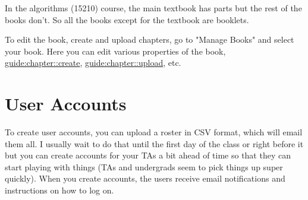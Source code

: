 \begin{example}
In the algorithms (15210) course, the main textbook has parts but
the rest of the books don't.  So all the books except for the textbook are booklets.
\end{example}


\begin{gram}
To edit the book, create and upload chapters, go to "Manage Books" and select your book.  Here you can edit various properties of the book, 
%
\href{create chapters}{guide:chapter::create}, 
%
\href{upload content}{guide:chapter::upload}, etc.
\end{gram}


\section{User Accounts} 

\begin{gram}[Creation]
To create user accounts, you can upload a roster in CSV format, which will email them all.  
%
I usually wait to do that until the first day of the class or right before it but you can create accounts for your TAs a bit ahead of time so that they can start playing with things (TAs and undergrads seem to pick things up super quickly).  When you create accounts, the users receive email notifications and instructions on how to log on.
\end{gram}

